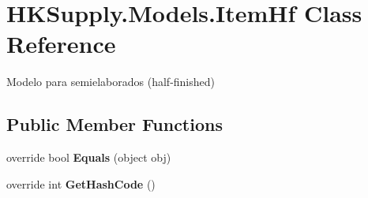 \hypertarget{class_h_k_supply_1_1_models_1_1_item_hf}{}\section{H\+K\+Supply.\+Models.\+Item\+Hf Class Reference}
\label{class_h_k_supply_1_1_models_1_1_item_hf}


Modelo para semielaborados (half-\/finished)  


\subsection*{Public Member Functions}
\begin{DoxyCompactItemize}
\item 
\mbox{\label{class_h_k_supply_1_1_models_1_1_item_hf_af5d307f1cbf78cb489fc79cc11337b17}} 
override bool {\bfseries Equals} (object obj)
\item 
\mbox{\label{class_h_k_supply_1_1_models_1_1_item_hf_a05da312ca5637a5b9afb4b980aa47bd3}} 
override int {\bfseries Get\+Hash\+Code} ()
\end{DoxyCompactItemize}
